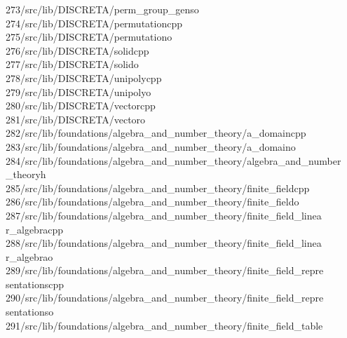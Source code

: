 \begin{tabbing}
273\>/src/lib/DISCRETA/perm\_group\_genso\\[0pt]
274\>/src/lib/DISCRETA/permutationcpp\\[0pt]
275\>/src/lib/DISCRETA/permutationo\\[0pt]
276\>/src/lib/DISCRETA/solidcpp\\[0pt]
277\>/src/lib/DISCRETA/solido\\[0pt]
278\>/src/lib/DISCRETA/unipolycpp\\[0pt]
279\>/src/lib/DISCRETA/unipolyo\\[0pt]
280\>/src/lib/DISCRETA/vectorcpp\\[0pt]
281\>/src/lib/DISCRETA/vectoro\\[0pt]
282\>/src/lib/foundations/algebra\_and\_number\_theory/a\_domaincpp\\[0pt]
283\>/src/lib/foundations/algebra\_and\_number\_theory/a\_domaino\\[0pt]
284\>/src/lib/foundations/algebra\_and\_number\_theory/algebra\_and\_number\\[0pt]
\>\_theoryh\\[0pt]
285\>/src/lib/foundations/algebra\_and\_number\_theory/finite\_fieldcpp\\[0pt]
286\>/src/lib/foundations/algebra\_and\_number\_theory/finite\_fieldo\\[0pt]
287\>/src/lib/foundations/algebra\_and\_number\_theory/finite\_field\_linea\\[0pt]
\>r\_algebracpp\\[0pt]
288\>/src/lib/foundations/algebra\_and\_number\_theory/finite\_field\_linea\\[0pt]
\>r\_algebrao\\[0pt]
289\>/src/lib/foundations/algebra\_and\_number\_theory/finite\_field\_repre\\[0pt]
\>sentationscpp\\[0pt]
290\>/src/lib/foundations/algebra\_and\_number\_theory/finite\_field\_repre\\[0pt]
\>sentationso\\[0pt]
291\>/src/lib/foundations/algebra\_and\_number\_theory/finite\_field\_table\\[0pt]

\end{tabbing}
